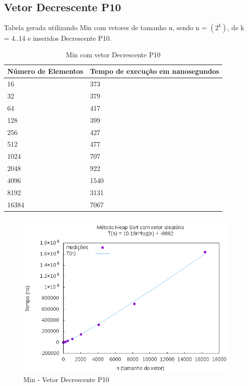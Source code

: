 \documentclass[12pt,a4paper,twoside]{report}
\begin{document}
\subsection{Vetor Decrescente P10}
Tabela gerada utilizando Min com vetores de tamanho n, sendo n = $(2^k)$, de k = 4..14 e inseridos Decrescente P10.
\begin{table}[H]
\centering
\caption{Min com vetor Decrescente P10}
\label{my-label}
\begin{tabular}{|l|l|}
\hline
\multicolumn{1}{|c|}{\textbf{Número de Elementos}} & \multicolumn{1}{c|}{\textbf{Tempo de execução em nanosegundos}} \\ \hline
16 & 373 \\ \hline
32 & 379 \\ \hline
64 & 417 \\ \hline
128 & 399 \\ \hline
256 & 427 \\ \hline
512 & 477 \\ \hline
1024 & 707 \\ \hline
2048 & 922 \\ \hline
4096 & 1540 \\ \hline
8192 & 3131 \\ \hline
16384 & 7067 \\ \hline
\end{tabular}
\end{table}

\begin{figure}[H]
    \centering
    \includegraphics[width=0.7\linewidth]{graficos/HeapSort/vIntAleatorio/vIntAleatorio.png}
  \caption{Min - Vetor Decrescente P10}
\end{figure}
\end{document}

